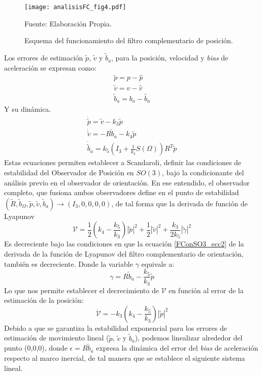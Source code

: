 \documentclass[10pt]{report}
\numberwithin{equation}{chapter}
\numberwithin{algorithm}{chapter}
\newcommand{\bias}{\emph{bias} }
\begin{document}
\begin{figure}
\center
\texttt{[image: analisisFC\_fig4.pdf]}
\caption{Esquema del funcionamiento del filtro complementario de posición.}
\scriptsize{Fuente: Elaboración Propia.}
\label{FConSO3_fig4}
\end{figure}
Los errores de estimación $\tilde{p}$, $\tilde{v}$ y $\tilde{b}_a$, para la posición, velocidad y \bias de aceleración se expresan como:
\begin{equation}
\begin{array}{c}
\tilde{p}=p-\hat{p}\\
\tilde{v}=v-\hat{v}\\
\tilde{b}_a=b_a-\hat{b}_a
\end{array}
\end{equation}
Y su dinámica.
\begin{equation}\label{obs_ecc60}
\begin{array}{c}
\dot{\tilde{p}}=\tilde{v}-k_3\tilde{p}\\
\dot{\tilde{v}}=-R\tilde{b}_a-k_4\tilde{p}\\
\dot{\tilde{b}}_a=k_5(I_3+\frac{1}{k_3}S(\Omega))R^T\tilde{p}
\end{array}
\end{equation}
Estas ecuaciones permiten establecer a Scandaroli, definir las condiciones de estabilidad del Observador de Posición en $SO(3)$, bajo la condicionante del análisis previo en el observador de orientación. En ese entendido, el observador completo, que fusiona ambos observadores define en el punto de estabilidad $(\tilde{R},\tilde{b}_{\Omega},\tilde{p},\tilde{v},\tilde{b}_a)\rightarrow(I_3,0,0,0,0)$, de tal forma que la derivada de función de Lyapunov
$$\mathcal{V}=\frac{1}{2}(k_4-\frac{k_5}{k_3})|\tilde{p}|^2+\frac{1}{2}|\tilde{v}|^2+\frac{k_3}{2k_5}|\tilde{\gamma}|^2$$ 
Es decreciente bajo las condiciones en que la ecuación \eqref{FConSO3_ecc2} de la derivada de la función de Lyapunov del filtro complementario de orientación, también es decreciente. Donde la variable $\gamma$ equivale a:
$$\gamma=R\tilde{b}_a-\frac{k_5}{k_3}\tilde{p}$$
Lo que nos permite establecer el decrecimiento de $\mathcal{V}$ en función al error de la estimación de la posición:
$$\dot{\mathcal{V}}=-k_3(k_4-\frac{k_5}{k_3})|\tilde{p}|^2$$
Debido a que se garantiza la estabilidad exponencial para los errores de estimación de movimiento lineal ($\tilde{p}$, $\tilde{v}$ y $\tilde{b}_a$), podemos linealizar alrededor del punto (0,0,0), donde $\epsilon=R\tilde{b}_a$ expresa la dinámica del error del \bias de aceleración respecto al marco inercial, de tal manera que se establece el siguiente sistema lineal.
\end{document}
